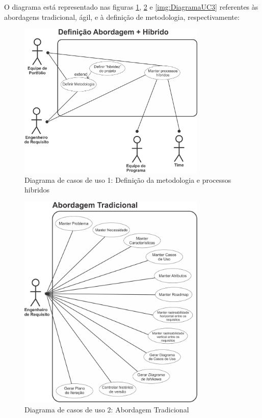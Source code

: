O diagrama está representado nas figuras \ref{img:DiagramaUC1}, \ref{img:DiagramaUC2} e \ref{img:DiagramaUC3} referentes às abordagens tradicional, ágil, e à definição de metodologia, respectivamente:
\begin{figure}[H]
	\centering
	\includegraphics[width=0.8\textwidth]{imgModelagem/DiagramaUC1}
	\caption{Diagrama de casos de uso 1: Definição da metodologia e processos hibridos}
	\label{img:DiagramaUC1}
\end{figure}

\begin{figure}[H]
	\centering
	\includegraphics[width=0.8\textwidth]{imgModelagem/DiagramaUC2}
	\caption{Diagrama de casos de uso 2: Abordagem Tradicional}
	\label{img:DiagramaUC2}
\end{figure}

